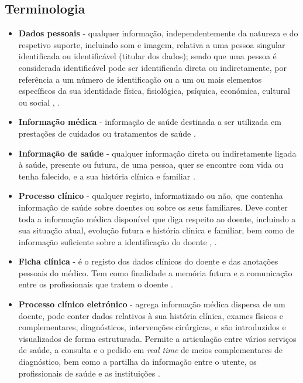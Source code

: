 \documentclass[conference]{IEEEtran}
\begin{document}
\subsection{Terminologia}

\begin{itemize}

	\item \textbf{Dados pessoais} - qualquer informação, independentemente da natureza e do respetivo suporte, incluindo som e imagem, relativa a uma pessoa singular identificada ou identificável (titular dos dados); sendo que uma pessoa é considerada identificável pode ser identificada direta ou indiretamente, por referência a um número de identificação ou a um ou mais elementos específicos da sua identidade física, fisiológica, psíquica, económica, cultural ou social \cite{parecerERS2015}, \cite{CNPDinfsaude2014}.
	
	\item \textbf{Informação médica} - informação de saúde destinada a ser utilizada em prestações de cuidados ou tratamentos de saúde \cite{regulamentodeonmedic}.
	
	\item \textbf{Informação de saúde} - qualquer informação direta ou indiretamente ligada à saúde, presente ou futura, de uma pessoa, quer se encontre com vida ou tenha falecido, e a sua história clínica e familiar \cite{consolidacaoinfsaude}.
	
	\item \textbf{Processo clínico} - qualquer registo, informatizado ou não, que contenha informação de saúde sobre doentes ou sobre os seus familiares. Deve conter toda a informação médica disponível que diga respeito ao doente, incluindo a sua situação atual, evolução futura e história clínica e familiar, bem como de informação suficiente sobre a identificação do doente \cite{regulamentodeonmedic}, \cite{parecerERS2015}. 
	
	\item \textbf{Ficha clínica} - é o registo dos dados clínicos do doente e das anotações pessoais do médico. Tem como finalidade a memória futura e a comunicação entre os profissionais que tratem o doente \cite{regulamentodeonmedic}.
	
	\item \textbf{Processo clínico eletrónico} - agrega informação médica dispersa de um doente, pode conter dados relativos à sua história clínica, exames físicos e complementares, diagnósticos, intervenções cirúrgicas, e são introduzidos e visualizados de forma estruturada. Permite a articulação entre vários serviços de saúde, a consulta e o pedido em \textit{real time} de meios complementares de diagnóstico, bem como a partilha da informação entre o utente, os profissionais de saúde e as instituições \cite{CNPDinfsaude2014}.
	

\end{itemize}
\end{document}
